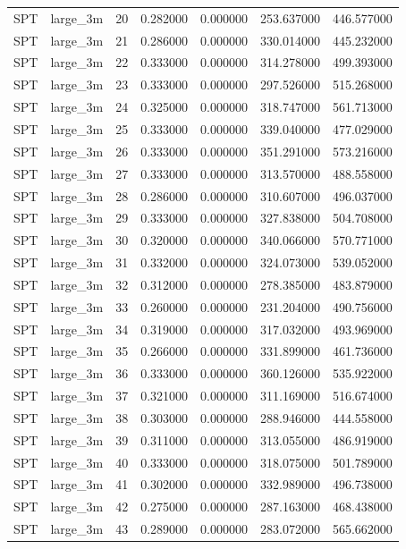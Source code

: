 \begin{tabular}{llrrrrr}
SPT & large_3m & 20 & 0.282000 & 0.000000 & 253.637000 & 446.577000 \\
SPT & large_3m & 21 & 0.286000 & 0.000000 & 330.014000 & 445.232000 \\
SPT & large_3m & 22 & 0.333000 & 0.000000 & 314.278000 & 499.393000 \\
SPT & large_3m & 23 & 0.333000 & 0.000000 & 297.526000 & 515.268000 \\
SPT & large_3m & 24 & 0.325000 & 0.000000 & 318.747000 & 561.713000 \\
SPT & large_3m & 25 & 0.333000 & 0.000000 & 339.040000 & 477.029000 \\
SPT & large_3m & 26 & 0.333000 & 0.000000 & 351.291000 & 573.216000 \\
SPT & large_3m & 27 & 0.333000 & 0.000000 & 313.570000 & 488.558000 \\
SPT & large_3m & 28 & 0.286000 & 0.000000 & 310.607000 & 496.037000 \\
SPT & large_3m & 29 & 0.333000 & 0.000000 & 327.838000 & 504.708000 \\
SPT & large_3m & 30 & 0.320000 & 0.000000 & 340.066000 & 570.771000 \\
SPT & large_3m & 31 & 0.332000 & 0.000000 & 324.073000 & 539.052000 \\
SPT & large_3m & 32 & 0.312000 & 0.000000 & 278.385000 & 483.879000 \\
SPT & large_3m & 33 & 0.260000 & 0.000000 & 231.204000 & 490.756000 \\
SPT & large_3m & 34 & 0.319000 & 0.000000 & 317.032000 & 493.969000 \\
SPT & large_3m & 35 & 0.266000 & 0.000000 & 331.899000 & 461.736000 \\
SPT & large_3m & 36 & 0.333000 & 0.000000 & 360.126000 & 535.922000 \\
SPT & large_3m & 37 & 0.321000 & 0.000000 & 311.169000 & 516.674000 \\
SPT & large_3m & 38 & 0.303000 & 0.000000 & 288.946000 & 444.558000 \\
SPT & large_3m & 39 & 0.311000 & 0.000000 & 313.055000 & 486.919000 \\
SPT & large_3m & 40 & 0.333000 & 0.000000 & 318.075000 & 501.789000 \\
SPT & large_3m & 41 & 0.302000 & 0.000000 & 332.989000 & 496.738000 \\
SPT & large_3m & 42 & 0.275000 & 0.000000 & 287.163000 & 468.438000 \\
SPT & large_3m & 43 & 0.289000 & 0.000000 & 283.072000 & 565.662000 \\

\end{tabular}
